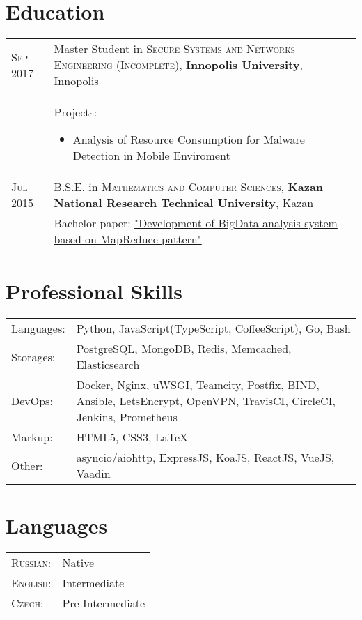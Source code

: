 \documentclass[a4paper,10pt]{article}
\begin{document}
\section{Education}
\begin{tabular}{R{2cm}L{15cm}}
	\textsc{Sep} 2017 & Master Student in \textsc{Secure Systems and Networks Engineering (Incomplete)}, \textbf{Innopolis University}, Innopolis                    \\
	                  & Projects:                                                                                                                                    
	\begin{itemize}
	\item Analysis of Resource Consumption for Malware Detection in Mobile Enviroment
	\end{itemize}\\
	\textsc{Jul} 2015 & B.S.E. in \textsc{Mathematics and Computer Sciences}, \textbf{Kazan National Research Technical University}, Kazan                           \\
	                  & Bachelor paper: \href{https://github.com/litleleprikon/bachelor\_paper}{"Development of BigData analysis system based on MapReduce pattern"} \\
\end{tabular}

\section{Professional Skills}
\begin{tabular}{R{2cm}L{15cm}}
	Languages:    & Python, JavaScript(TypeScript, CoffeeScript), Go, Bash                                                                \\
	Storages: & PostgreSQL, MongoDB, Redis, Memcached, Elasticsearch                                                                  \\
	DevOps:   & Docker, Nginx, uWSGI, Teamcity, Postfix, BIND, Ansible, LetsEncrypt, OpenVPN, TravisCI, CircleCI, Jenkins, Prometheus \\
	Markup:   & HTML5, CSS3, \LaTeX                                                                                                   \\
	Other:    & asyncio/aiohttp, ExpressJS, KoaJS, ReactJS, VueJS, Vaadin                                                             
\end{tabular}

\section{Languages}
\begin{tabular}{R{2cm}L{15cm}}
	\textsc{Russian:} & Native           \\
	\textsc{English:} & Intermediate     \\
	\textsc{Czech:}   & Pre-Intermediate \\
\end{tabular}
\end{document}
